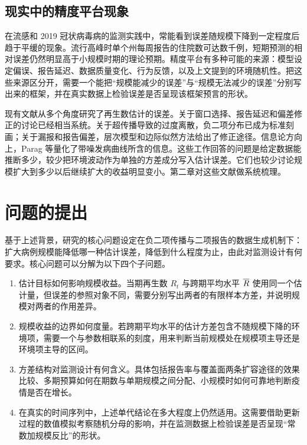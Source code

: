 \subsection{现实中的精度平台现象}

在流感和 2019 冠状病毒病的监测实践中，常能看到误差随规模下降到一定程度后趋于平缓的现象。流行高峰时单个州每周报告的住院数可达数千例，短期预测的相对误差仍然明显高于小规模时期的理论预期\citep{reich2019accuracy, cramer2022evaluation}。精度平台有多种可能的来源：模型设定偏误、报告延迟、数据质量变化、行为反馈，以及上文提到的环境随机性。把这些来源区分开，需要一个能把“规模能减少的误差”与“规模无法减少的误差”分别写出来的框架，并在真实数据上检验误差是否呈现该框架预言的形状。

现有文献从多个角度研究了再生数估计的误差。关于窗口选择、报告延迟和偏差修正的讨论已经相当系统\citep{thompson2019improved, gostic2020practical, nouvellet2018simple, steyn2025primer}。关于超传播导致的过度离散，负二项分布已成为标准刻画\citep{lloydsmith2005superspreading, endo2020estimating}；关于漏报和报告偏差，层次模型和边际似然方法给出了修正途径\citep{azmon2014estimating, stoner2019hierarchical, bracher2021marginal}。信息论方向上，Parag 等量化了带噪发病曲线所含的信息\citep{parag2022quantifying, parag2025asymmetric}。这些工作回答的问题是给定数据能推断多少，较少把环境波动作为单独的方差成分写入估计误差。它们也较少讨论规模扩大到多少以后继续扩大的收益明显变小。第二章对这些文献做系统梳理。

\section{问题的提出}
\label{sec:intro-question}

基于上述背景，研究的核心问题设定在负二项传播与二项报告的数据生成机制下：扩大病例规模能降低哪一种估计误差，降低到什么程度为止，由此对监测设计有何要求。核心问题可以分解为以下四个子问题。

\begin{enumerate}[label=(\arabic*)]
  \item 估计目标如何影响规模收益。当期再生数 $R_t$ 与跨期平均水平 $\overline{R}$ 使用同一个估计量，但误差的参照对象不同，需要分别写出两者的有限样本方差，并说明规模对两者的作用差异。
  \item 规模收益的边界如何度量。若跨期平均水平的估计方差包含不随规模下降的环境项，需要一个与参数相联系的刻度，用来判断当前规模处在规模项主导还是环境项主导的区间。
  \item 方差结构对监测设计有何含义。具体包括报告率与覆盖面两条扩容途径的效果比较、多期预算如何在期数与单期规模之间分配、小规模时如何可靠地判断疫情是否在增长。
  \item 在真实的时间序列中，上述单代结论在多大程度上仍然适用。这需要借助更新过程的数值模拟考察随机分母的影响，并在监测数据上检验误差是否呈现“常数加规模反比”的形状。
\end{enumerate}

